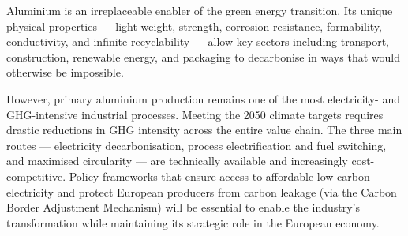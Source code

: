 Aluminium is an irreplaceable enabler of the green energy transition. Its unique physical properties
— light weight, strength, corrosion resistance, formability, conductivity, and infinite
recyclability — allow key sectors including transport, construction, renewable energy, and packaging
to decarbonise in ways that would otherwise be impossible.

However, primary aluminium production remains one of the most electricity- and GHG-intensive
industrial processes. Meeting the 2050 climate targets requires drastic reductions in GHG intensity
across the entire value chain. The three main routes — electricity decarbonisation, process
electrification and fuel switching, and maximised circularity — are technically available and
increasingly cost-competitive. Policy frameworks that ensure access to affordable low-carbon
electricity and protect European producers from carbon leakage (via the Carbon Border Adjustment
Mechanism) will be essential to enable the industry's transformation while maintaining its
strategic role in the European economy.